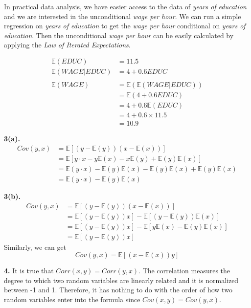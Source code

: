 \documentclass[UTF8]{ctexart}
\begin{document}
In practical data analysis, we have easier access to the data of \textit{years of education} and 
we are interested in the unconditional \textit{wage per hour}. We can run a simple regression on 
\textit{years of education} to get the \textit{wage per hour} conditional on \textit{years of education}. 
Then the unconditional \textit{wage per hour} can be easily calculated by applying the \textit{Law of Iterated Expectations}.

\begin{align*}
    \mathbb{E}(EDUC)&=11.5 \\
    \mathbb{E}(WAGE|EDUC)&=4 + 0.6 EDUC \\
    \\
    \mathbb{E}(WAGE)&=\mathbb{E}(\mathbb{E}(WAGE|EDUC)) \\
    &=\mathbb{E}(4 + 0.6 EDUC) \\
    &=4+0.6\mathbb{E}(EDUC) \\
    &=4+0.6 \times 11.5 \\
    &=10.9
\end{align*}
\bigskip


\textbf{3(a).}
\begin{align*}
Cov(y,x)&=\mathbb{E}[(y-\mathbb{E}(y))(x-\mathbb{E}(x))] \\
&=\mathbb{E}[y \cdot x-y\mathbb{E}(x)-x\mathbb{E}(y)+\mathbb{E}(y)\mathbb{E}(x)] \\
&=\mathbb{E}(y \cdot x)-\mathbb{E}(y)\mathbb{E}(x)-\mathbb{E}(y)\mathbb{E}(x)+\mathbb{E}(y)\mathbb{E}(x) \\
&=\mathbb{E}(y \cdot x)-\mathbb{E}(y)\mathbb{E}(x)
\end{align*}
\bigskip

\textbf{3(b).}
\begin{align*}
Cov(y,x)&=\mathbb{E}[(y-\mathbb{E}(y))(x-\mathbb{E}(x))] \\
&=\mathbb{E}[(y-\mathbb{E}(y))x]-\mathbb{E}[(y-\mathbb{E}(y))\mathbb{E}(x)] \\
&=\mathbb{E}[(y-\mathbb{E}(y))x]-\mathbb{E}[y\mathbb{E}(x)-\mathbb{E}(y)\mathbb{E}(x)] \\
&=\mathbb{E}[(y-\mathbb{E}(y))x]
\end{align*}
Similarly, we can get
\[Cov(y,x)=\mathbb{E}[(x-\mathbb{E}(x))y] \]
\bigskip

\textbf{4.}\newline
It is true that $Corr(x,y)=Corr(y,x)$. The correlation measures the degree to which two random variables 
are linearly related and it is normalized between -1 and 1. Therefore, it has nothing to do with the order 
of how two random variables enter into the formula since $Cov(x,y)=Cov(y,x)$.
\bigskip
\end{document}
